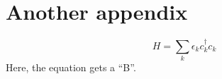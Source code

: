 
\chapter{Another appendix}\label{ch:appendixB}
\begin{equation}
	H = \sum_{k}\epsilon_kc_k^\dagger c_k
\end{equation}
Here, the equation gets a ``B''.